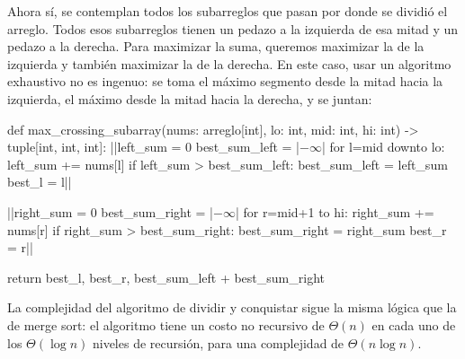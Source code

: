 Ahora sí, se contemplan todos los subarreglos que pasan por donde se dividió el arreglo. Todos esos subarreglos tienen un pedazo a la izquierda de esa mitad y un pedazo a la derecha. Para maximizar la suma, queremos maximizar la de la izquierda y también maximizar la de la derecha. En este caso, usar un algoritmo exhaustivo no es ingenuo: se toma el máximo segmento desde la mitad hacia la izquierda, el máximo desde la mitad hacia la derecha, y se juntan:
\begin{codeblock}
\begin{pseudocode}
def max_crossing_subarray(nums: arreglo[int], lo: int, mid: int, hi: int) -> tuple[int, int, int]:
    ||left_sum = 0
    best_sum_left = |\(-\infty\)|
    for l=mid downto lo:
        left_sum += nums[l]
        if left_sum > best_sum_left:
            best_sum_left = left_sum
            best_l = l||

    ||right_sum = 0
    best_sum_right = |\(-\infty\)|
    for r=mid+1 to hi:
        right_sum += nums[r]
        if right_sum > best_sum_right:
            best_sum_right = right_sum
            best_r = r||

    return best_l, best_r, best_sum_left + best_sum_right
\end{pseudocode}
\begin{annotations}
\end{annotations}
\end{codeblock}

La complejidad del algoritmo de dividir y conquistar sigue la misma lógica que la de merge sort: el algoritmo tiene un costo no recursivo de \(\Theta(n)\) en cada uno de los \(\Theta(\log n)\) niveles de recursión, para una complejidad de \(\Theta(n \log n)\).

